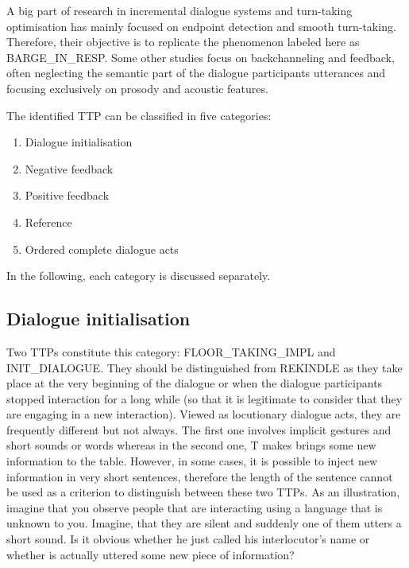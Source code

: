     A big part of research in incremental dialogue systems and turn-taking optimisation has mainly focused on endpoint detection \cite{Raux2008} and smooth turn-taking. Therefore, their objective is to replicate the phenomenon labeled here as BARGE\_IN\_RESP. Some other studies focus on backchanneling and feedback, often neglecting the semantic part of the dialogue participants utterances and focusing exclusively on prosody and acoustic features.
    


    The identified TTP can be classified in five categories:
    
    \begin{enumerate}
      \item Dialogue initialisation
      \item Negative feedback
      \item Positive feedback
      \item Reference
      \item Ordered complete dialogue acts
    \end{enumerate}

    In the following, each category is discussed separately.


    \subsection{Dialogue initialisation}
    \label{tax:dialinit}
		
         Two TTPs constitute this category: FLOOR\_TAKING\_IMPL and INIT\_DIALOGUE. They should be distinguished from REKINDLE as they take place at the very beginning of the dialogue or when the dialogue participants stopped interaction for a long while (so that it is legitimate to consider that they are engaging in a new interaction). Viewed as locutionary dialogue acts, they are frequently different but not always. The first one involves implicit gestures and short sounds or words whereas in the second one, T makes brings some new information to the table. However, in some cases, it is possible to inject new information in very short sentences, therefore the length of the sentence cannot be used as a criterion to distinguish between these two TTPs. As an illustration, imagine that you observe people that are interacting using a language that is unknown to you. Imagine, that they are silent and suddenly one of them utters a short sound. Is it obvious whether he just called his interlocutor's name or whether is actually uttered some new piece of information?
			
